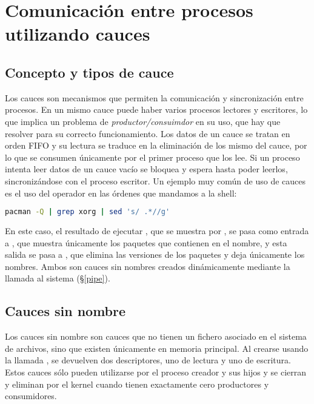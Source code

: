 \section{Comunicación entre procesos utilizando cauces}

\subsection{Concepto y tipos de cauce}

Los cauces son mecanismos que permiten la comunicación y sincronización entre procesos.
En un mismo cauce puede haber varios procesos lectores y escritores, lo que implica un problema de \emph{productor/consuimdor} en su uso, que hay que resolver para su correcto funcionamiento.
Los datos de un cauce se tratan en orden FIFO y su lectura se traduce en la eliminación de los mismo del cauce, por lo que se consumen únicamente por el primer proceso que los lee.
Si un proceso intenta leer datos de un cauce vacío se bloquea y espera hasta poder leerlos, sincronizándose con el proceso escritor.
Un ejemplo muy común de uso de cauces es el uso del operador \code{|} en las órdenes que mandamos a la shell:

\begin{lstlisting}[language=Bash]
pacman -Q | grep xorg | sed 's/ .*//g'
\end{lstlisting}

En este caso, el resultado de ejecutar , que se muestra por , se pasa como entrada a , que muestra únicamente los paquetes que contienen  en el nombre, y esta salida se pasa a , que elimina las versiones de los paquetes y deja únicamente los nombres.
Ambos son cauces sin nombres creados dinámicamente mediante la llamada al sistema  (\S\ref{pipe}).

\subsection{Cauces sin nombre}

Los cauces sin nombre son cauces que no tienen un fichero asociado en el sistema de archivos, sino que existen únicamente en memoria principal.
Al crearse usando la llamada , se devuelven dos descriptores, uno de lectura y uno de escritura.
Estos cauces sólo pueden utilizarse por el proceso creador y sus hijos y se cierran y eliminan por el kernel cuando tienen exactamente cero productores y consumidores.

